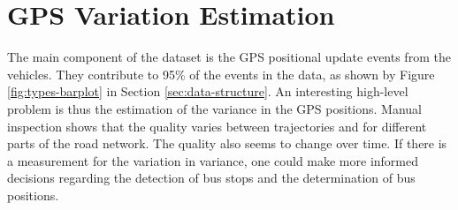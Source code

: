 \chapter{GPS Variation Estimation}
\label{cha:GPS-variation-estimation}

The main component of the dataset is the GPS positional update events from the vehicles.
They contribute to 95\% of the events in the data, as shown by Figure \ref{fig:types-barplot} in Section \ref{sec:data-structure}.
An interesting high-level problem is thus the estimation of the variance in the GPS positions.
Manual inspection shows that the quality varies between trajectories and for different parts of the road network.
The quality also seems to change over time.
If there is a measurement for the variation in variance, one could make more informed decisions regarding the detection of bus stops and the determination of bus positions. 

